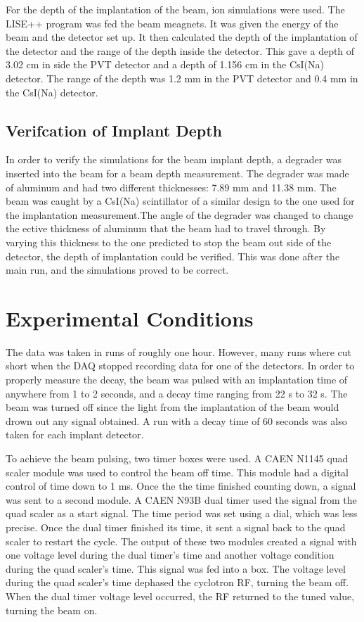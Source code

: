 For the depth of the implantation of the beam, ion simulations were used. 
The LISE++ program was fed the beam meagnets. It was given the energy of the beam and the detector set up. 
It then calculated the depth of the implantation of the detector and the range of the depth inside the detector. 
This gave a depth of 3.02 cm in side the PVT detector and a depth of 1.156 cm in the CsI(Na) detector. 
The range of the depth was 1.2 mm in the PVT detector and 0.4 mm in the CsI(Na) detector.


\subsection{Verifcation of Implant Depth}

In order to verify the simulations for the beam implant depth, a degrader was inserted into the beam for a beam depth measurement.
The degrader was made of aluminum and had two different thicknesses: 7.89 mm and 11.38 mm. 
The beam was caught by a CsI(Na) scintillator of a similar design to the one used for the implantation measurement.The angle of the degrader was changed to change the ective thickness of aluminum that the beam
had to travel through. By varying this thickness to the one predicted to stop the beam out side of the detector, the depth of implantation could be verified. 
This was done after the main run, and the simulations proved to be correct.

\section{Experimental Conditions}
The data was taken in runs of roughly one hour. 
However, many runs where cut short when the DAQ stopped recording data for one of the detectors.
In order to properly measure the decay, the beam was pulsed with an implantation time of anywhere from 1 to 2 seconds, and a decay time ranging from 22 s to 32 s. 
The beam was turned off since the light from the implantation of the beam would drown out any signal obtained. 
A run with a decay time of 60 seconds was also taken for each implant detector. 

To achieve the beam pulsing, two timer boxes were used.
A CAEN N1145 quad scaler module was used to control the beam off time.
This module had a digital control of time down to 1 ms.
Once the the time finished counting down, a signal was sent to a second module. 
A CAEN N93B dual timer used the signal from the quad scaler as a start signal.
The time period was set using a dial, which was less precise. 
Once the dual timer finished its time, it sent a signal back to the quad scaler to restart the cycle.
The output of these two modules created a signal with one voltage level during the dual timer's time and another voltage condition during the quad scaler's time.
This signal was fed into a box.
The voltage level during the quad scaler's time dephased the cyclotron RF, turning the beam off.
When the dual timer voltage level occurred, the RF returned to the tuned value, turning the beam on.  


